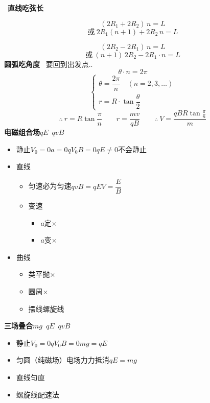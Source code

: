 \ \textbf{直线吃弦长}

\[ (2R_1+2R_2)\,n=L \]
\[ \text{或}\ 2R_1(n+1)+2R_2\,n=L \]

\[ (2R_2-2R_1)\,n=L \]
\[ \text{或}\ (n+1)\,2R_2-2R_1\cdot n=L \]
\textbf{圆弧吃角度}\ 
要回到出发点..
\[ \theta\cdot n=2\pi \]
\[ \begin{cases}\theta=\dfrac{2\pi}{n}\quad(n=2,3,\dots)\\[1ex] r=R\cdot\tan\dfrac{\theta}{2}\end{cases} \]
\[ \therefore\ r=R\tan\frac{\pi}{n}\qquad r=\frac{mv}{qB}\qquad \therefore\ V=\frac{qBR\tan\frac{\pi}{n}}{m} \]
\textbf{电磁组合场}\quad $qE$\ $qvB$
\begin{itemize}
\item 静止\quad $V_0=0$\quad $a=0$\quad $qV_0B=0$\quad $qE\ne0$\quad 不会静止
\item 直线
  \begin{itemize}
  \item 匀速\quad 必为匀速\quad $qvB=qE$\quad $V=\dfrac{E}{B}$
  \item 变速
    \begin{itemize}
    \item $a$定\quad $\times$
    \item $a$变\quad $\times$
    \end{itemize}
  \end{itemize}
\item 曲线
  \begin{itemize}
  \item 类平抛\quad $\times$
  \item 圆周\quad $\times$
  \item 摆线\quad 螺旋线
  \end{itemize}
\end{itemize}
\textbf{三场叠合}\quad $mg$\ $qE$\ $qvB$
\begin{itemize}
\item 静止\quad $V_0=0$\quad $qV_0B=0$\quad $mg=qE$
\item 匀圆（纯磁场）\quad 电场力力抵消\quad $qE=mg$
\item 直线\quad 匀直
\item 螺旋线\quad 配速法
\end{itemize}
